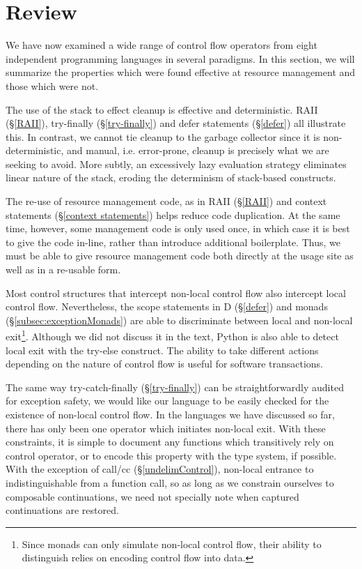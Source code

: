 \documentclass[11pt]{article}
\newcommand{\maybePage}{\newpage}
\begin{document}
\maybePage
\section{Review}
\label{sec:review}

We have now examined a wide range of control flow operators from eight independent programming languages in several paradigms.
In this section, we will summarize the properties which were found effective at resource management and those which were not.

The use of the stack to effect cleanup is effective and deterministic.
RAII (\S\ref{RAII}), try-finally (\S\ref{try-finally}) and defer statements (\S\ref{defer}) all illustrate this.
In contrast, we cannot tie cleanup to the garbage collector since it is non-deterministic, and manual, i.e. error-prone, cleanup is precisely what we are seeking to avoid.
More subtly, an excessively lazy evaluation strategy eliminates linear nature of the stack, eroding the determinism of stack-based constructs.

The re-use of resource management code, as in RAII (\S\ref{RAII}) and context statements (\S\ref{context statements}) helps reduce code duplication.
At the same time, however, some management code is only used once, in which case it is best to give the code in-line, rather than introduce additional boilerplate.
Thus, we must be able to give resource management code both directly at the usage site as well as in a re-usable form.

Most control structures that intercept non-local control flow also intercept local control flow.
Nevertheless, the scope statements in D (\S\ref{defer}) and monads (\S\ref{subsec:exceptionMonads}) are able to discriminate between local and non-local exit\footnote{Since monads can only simulate non-local control flow, their ability to distinguish relies on encoding control flow into data.}.
Although we did not discuss it in the text, Python is also able to detect local exit with the try-else construct.\cite{pythonDocs}
The ability to take different actions depending on the nature of control flow is useful for software transactions.

The same way try-catch-finally (\S\ref{try-finally}) can be straightforwardly audited for exception safety, we would like our language to be easily checked for the existence of non-local control flow.
In the languages we have discussed so far, there has only been one operator which initiates non-local exit.
With these constraints, it is simple to document any functions which transitively rely on control operator, or to encode this property with the type system, if possible.
With the exception of call/cc (\S\ref{undelimControl}), non-local entrance to indistinguishable from a function call, so as long as we constrain ourselves to composable continuations, we need not specially note when captured continuations are restored.
\end{document}
